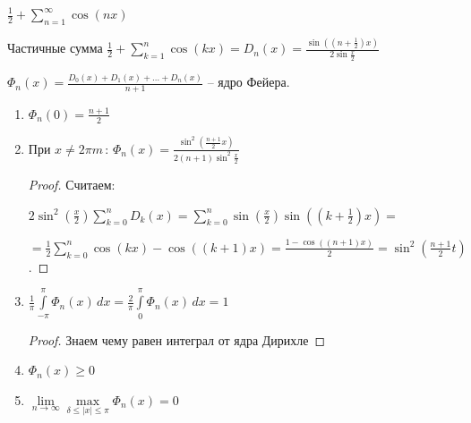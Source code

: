 \begin{example}
    $\frac{1}{2} + \sum\limits_{n=1}^\infty \cos (nx)$

    Частичные сумма $\frac{1}{2} + \sum\limits_{k=1}^n \cos (kx) = D_n (x) = \frac{\sin ((n + \frac{1}{2})x)}{2\sin \frac{x}{2}}$

    \begin{definition}
        $\Phi_n (x) = \frac{D_0 (x) + D_1 (x) + \ldots + D_n (x)}{n + 1}$ -- ядро Фейера.
    \end{definition}

    \begin{properties}
        \begin{enumerate}
            \item {
                $\Phi_n (0) = \frac{n + 1}{2}$
            }
            \item {
                При $x \neq 2\pi m \, : \, \Phi_n (x) = \frac{\sin^2 \left(\frac{n + 1}{2} x\right)}{2(n + 1)\sin^2 \frac{x}{2}}$

                \begin{proof}


                    Считаем:
                    
                    $2 \sin^2(\frac{x}{2}) \sum_{k=0}^{n} D_k(x) = \sum_{k=0}^{n} \sin(\frac{x}{2}) \sin((k + \frac{1}{2}) x) =$
                    
                    $= \frac{1}{2} \sum_{k=0}^{n} \cos(kx) - \cos((k + 1) x) = \frac{1 - \cos((n+1) x)}{2} = \sin^2(\frac{n+1}{2} t)$.
                \end{proof}
            }
            \item {
                $\frac{1}{\pi} \int\limits_{-\pi}^\pi \Phi_n (x) \, dx = \frac{2}{\pi} \int\limits_0^\pi \Phi_n (x) \, dx = 1$

                \begin{proof}
                    Знаем чему равен интеграл от ядра Дирихле
                \end{proof}
            }
            \item {
                $\Phi_n (x) \geqslant 0$
            }
            \item {
                $\lim\limits_{n \to \infty} \max\limits_{\delta \leqslant |x| \leqslant \pi} \Phi_n (x) = 0$

}
\end{enumerate}
\end{properties}
\end{example}
